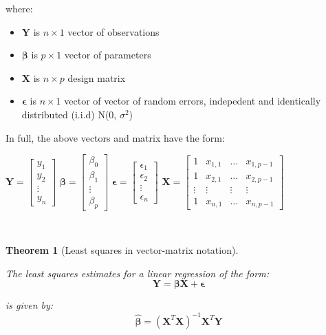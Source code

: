 \documentclass[
]{book}
\providecommand{\tightlist}{%
  \setlength{\itemsep}{0pt}\setlength{\parskip}{0pt}}
\newtheorem{theorem}{Theorem}[chapter]
\theoremstyle{definition}
\theoremstyle{definition}
\theoremstyle{definition}
\theoremstyle{remark}
\begin{document}
where:

\begin{itemize}
\tightlist
\item
  \(\mathbf{Y}\) is \(n \times1\) vector of observations
\item
  \(\boldsymbol\beta\) is \(p \times1\) vector of parameters
\item
  \(\mathbf{X}\) is \(n \times p\) design matrix
\item
  \(\boldsymbol\epsilon\) is \(n \times1\) vector of vector of random errors, indepedent and identically distributed (i.i.d) N(0, \(\sigma^2\))
\end{itemize}

In full, the above vectors and matrix have the form:

\(\mathbf{Y}=\begin{bmatrix}  y_1 \\  y_2 \\  \vdots \\  y_{n} \end{bmatrix}\)
\(\boldsymbol\beta=\begin{bmatrix}  \beta_0 \\  \beta_1 \\  \vdots \\  \beta_{p} \end{bmatrix}\)
\(\boldsymbol\epsilon=\begin{bmatrix}  \epsilon_1 \\  \epsilon_2 \\  \vdots \\  \epsilon_{n} \end{bmatrix}\)
\(\mathbf{X}=\begin{bmatrix}  1 & x_{1,1} & \dots & x_{1,p-1} \\  1 & x_{2,1} & \dots & x_{2,p-1} \\  \vdots & \vdots & \vdots & \vdots \\  1 & x_{n,1} & \dots & x_{n,p-1} \end{bmatrix}\)

~\\
\begin{theorem}[Least squares in vector-matrix notation]
\protect\hypertarget{thm:leastsq-02}{}{\label{thm:leastsq-02} {} }

The least squares estimates for a linear regression of the form:
\[\mathbf{Y} = \boldsymbol\beta\mathbf{X} + \boldsymbol\epsilon\]

is given by:
\[\hat{\mathbf{\beta}}= (\mathbf{X}^T\mathbf{X})^{-1}\mathbf{X}^T\mathbf{Y}\]
\end{theorem}
\end{document}
